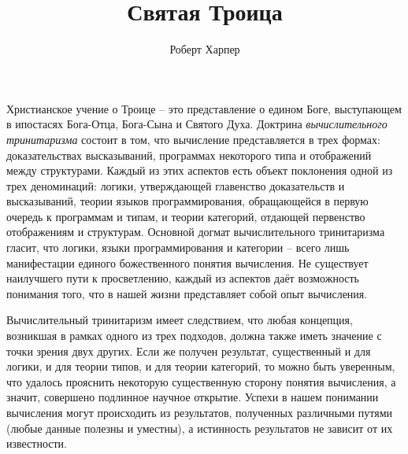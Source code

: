 \documentclass[a4paper,12pt]{article}
\title{Святая Троица}
\author{Роберт Харпер}
\date{}
\begin{document}
\maketitle

Христианское учение о Троице -- это представление о едином Боге, выступающем в ипостасях Бога-Отца, Бога-Сына и Святого Духа. Доктрина \textit{вычислительного тринитаризма} состоит в том, что вычисление представляется в трех формах: доказательствах высказываний, программах некоторого типа и отображений между структурами. Каждый из этих аспектов есть объект поклонения одной из трех деноминаций: логики, утверждающей главенство доказательств и высказываний, теории языков программирования, обращающейся в первую очередь к программам и типам, и теории категорий, отдающей первенство отображениям и структурам. Основной догмат вычислительного тринитаризма гласит, что логики, языки программирования и категории -- всего лишь манифестации единого божественного понятия вычисления. Не существует наилучшего пути к просветлению, каждый из аспектов даёт возможность понимания того, что в нашей жизни представляет собой опыт вычисления.

Вычислительный тринитаризм имеет следствием, что любая концепция, возникшая в рамках одного из трех подходов, должна также иметь значение с точки зрения двух других. Если же получен результат, существенный и для логики, и для теории типов, и для теории категорий, то можно быть уверенным, что удалось прояснить некоторую существенную сторону понятия вычисления, а значит, совершено подлинное научное открытие. Успехи в нашем понимании вычисления могут происходить из результатов, полученных различными путями (любые данные полезны и уместны), а истинность результатов не зависит от их известности.
\end{document}
